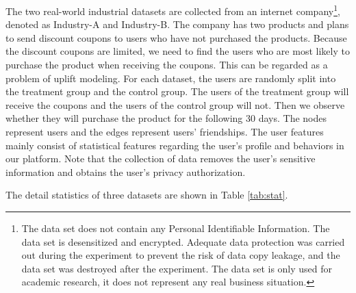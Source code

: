 The two real-world industrial datasets are collected from an internet company\footnote{The data set does not contain any Personal Identifiable Information. The data set is desensitized and encrypted. Adequate data protection was carried out during the experiment to prevent the risk of data copy leakage, and the data set was destroyed after the experiment. The data set is only used for academic research, it does not represent any real business situation.}, denoted as Industry-A and Industry-B. The company has two products and plans to send discount coupons to users who have not purchased the products. 
Because the discount coupons are limited,  we need to find the users who are most likely to purchase the product when receiving the coupons.
This can be regarded as a problem of uplift modeling.
For each dataset, the users are randomly split into the treatment group and the control group. The users of the treatment group will receive the coupons and the users of the control group will not. Then we observe whether they will purchase the product for the following $30$ days. The nodes represent users and the edges represent users' friendships. The user features mainly consist of statistical features regarding the user's profile and behaviors in our platform. Note that the collection of data removes the user's sensitive information and obtains the user's privacy authorization.

The detail statistics of three datasets are shown in Table \ref{tab:stat}.

\begin{table}
    \small 
	\begin{center}
		\caption{Statistics of datasets. $|V|$ denotes the number of users, $|E|$ denotes the number of edges and $|F|$ denotes the number of attributes. ${V_t}$ and ${V_c}$ represent the set of users in the treatment group and the set of users in the control group, respectively. }
		\label{tab:stat}
		\small
	\end{center}
	\label{tabdatasets}
\end{table}

